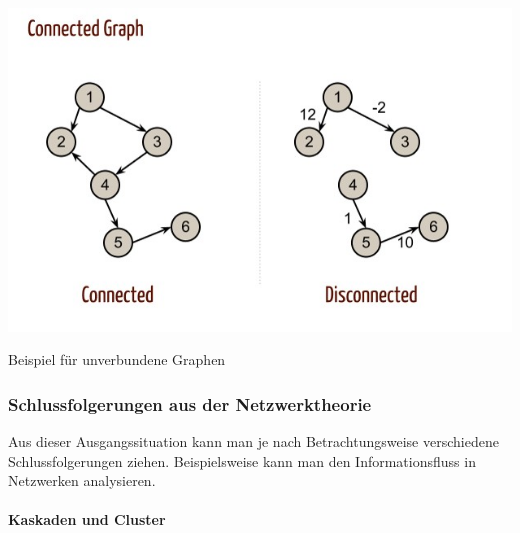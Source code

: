 \begin{dsafigure}
	\begin{center}
	\includegraphics[width=0.9\columnwidth]{img/Graph-Connected.jpg}
	\caption{Beispiel für unverbundene Graphen \parencite[vgl.]{Kleinberg-2009-oz}}
	\label{fig:graph-connected}
	\end{center}
\end{dsafigure}


\subsubsection{Schlussfolgerungen aus der Netzwerktheorie}

Aus dieser Ausgangssituation kann man je nach Betrachtungsweise verschiedene Schlussfolgerungen ziehen.
Beispielsweise kann man den Informationsfluss in Netzwerken analysieren.


\paragraph{Kaskaden und Cluster}

